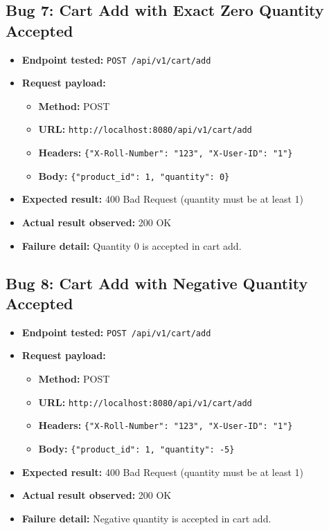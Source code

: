 ﻿\documentclass[11pt,a4paper]{article}
\begin{document}
\subsection*{Bug 7: Cart Add with Exact Zero Quantity Accepted}
\begin{itemize}
  \item \textbf{Endpoint tested:} \texttt{POST /api/v1/cart/add}
  \item \textbf{Request payload:}
  \begin{itemize}
    \item \textbf{Method:} POST
    \item \textbf{URL:} \texttt{http://localhost:8080/api/v1/cart/add}
    \item \textbf{Headers:} \texttt{\{"X-Roll-Number": "123", "X-User-ID": "1"\}}
    \item \textbf{Body:} \texttt{\{"product_id": 1, "quantity": 0\}}
  \end{itemize}
  \item \textbf{Expected result:} 400 Bad Request (quantity must be at least 1)
  \item \textbf{Actual result observed:} 200 OK
  \item \textbf{Failure detail:} Quantity 0 is accepted in cart add.
\end{itemize}

\subsection*{Bug 8: Cart Add with Negative Quantity Accepted}
\begin{itemize}
  \item \textbf{Endpoint tested:} \texttt{POST /api/v1/cart/add}
  \item \textbf{Request payload:}
  \begin{itemize}
    \item \textbf{Method:} POST
    \item \textbf{URL:} \texttt{http://localhost:8080/api/v1/cart/add}
    \item \textbf{Headers:} \texttt{\{"X-Roll-Number": "123", "X-User-ID": "1"\}}
    \item \textbf{Body:} \texttt{\{"product_id": 1, "quantity": -5\}}
  \end{itemize}
  \item \textbf{Expected result:} 400 Bad Request (quantity must be at least 1)
  \item \textbf{Actual result observed:} 200 OK
  \item \textbf{Failure detail:} Negative quantity is accepted in cart add.
\end{itemize}
\end{document}
